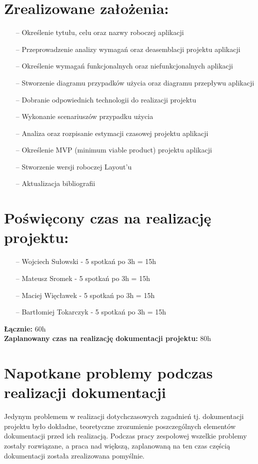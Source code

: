 \documentclass[12pt,a4paper]{article}
\begin{document}
\section{Zrealizowane założenia:}
\begin{itemize}
    \item [--] Określenie tytułu, celu oraz nazwy roboczej aplikacji
    \item [--] Przeprowadzenie analizy wymagań oraz deasemblacji projektu aplikacji
    \item [--] Określenie wymagań funkcjonalnych oraz niefunkcjonalnych aplikacji
    \item [--] Stworzenie diagramu przypadków użycia oraz diagramu przepływu aplikacji
    \item [--] Dobranie odpowiednich technologii do realizacji projektu
    \item [--] Wykonanie scenariuszów przypadku użycia
    \item [--] Analiza oraz rozpisanie estymacji czasowej projektu aplikacji
    \item [--] Określenie MVP (minimum viable product) projektu aplikacji
    \item [--] Stworzenie wersji roboczej Layout’u
    \item [--] Aktualizacja bibliografii
\end{itemize}

\section{Poświęcony czas na realizację projektu:}
\begin{itemize}
    \item [--] Wojciech Sułowski  - 5 spotkań po 3h = 15h
    \item [--] Mateusz Sromek  - 5 spotkań po 3h = 15h
    \item [--] Maciej Więcławek - 5 spotkań po 3h = 15h
    \item [--] Bartłomiej Tokarczyk -  5 spotkań po 3h = 15h
\end{itemize}
\textbf{Łącznie: }60h \\
\textbf{Zaplanowany czas na realizację dokumentacji projektu: }80h

\section{ Napotkane problemy podczas realizacji dokumentacji}
\hspace{5mm} Jedynym problemem w realizacji dotychczasowych zagadnień tj. dokumentacji projektu było dokładne, teoretyczne zrozumienie poszczególnych elementów dokumentacji przed ich realizacją. Podczas pracy zespołowej wszelkie problemy zostały rozwiązane, a praca nad większą, zaplanowaną na ten czas częścią dokumentacji została zrealizowana pomyślnie.
\end{document}
